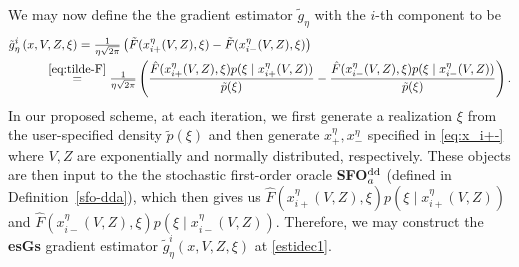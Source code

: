 \documentclass[11pt,reqno]{amsart}
\newcommand{\1}{{\bf 1}}
\newcommand{\2}{{\bf 2}}
\numberwithin{equation}{section}
\theoremstyle{remark}
\begin{document}
{					\medskip
					
					We may now define the the gradient estimator $\tilde{g}_\eta$ with the $i$-th component to be 
					\begin{align}\label{estidec1}
						\tilde{g}^i_\eta&\left(x,V,Z,\xi\right)=\tfrac{1}{\eta\sqrt{2\pi}}\left(\tilde{F}(x_{i+}^\eta(V,Z),\xi)-\tilde{F}(x_{i-}^\eta(V,Z),\xi)\right)\nonumber\\
						&\hspace{2em}\overset{\eqref{eq:tilde-F}}{=}\tfrac{1}{\eta\sqrt{2\pi}}\left(\frac{\hat{F}(x_{i+}^\eta(V,Z),\xi)p(\xi \mid x_{i+}^\eta(V,Z))}{\tilde{p}(\xi)}-\frac{\hat{F}(x_{i-}^\eta(V,Z),\xi)p(\xi \mid x_{i-}^\eta(V,Z))}{\tilde{p}(\xi)}\right).
					\end{align}
					In our proposed scheme, at each iteration, we first generate a {realization} $\xi$ from the user-specified density $\tilde{p}(\xi)$ and then generate  $x_{+}^{\eta}, x_{-}^{\eta}$ specified in \eqref{eq:x_i+-} where $V,Z$ are exponentially and normally distributed, respectively. These objects are then input to the {the stochastic first-order oracle  {\bf SFO$^{\rm dd}_a$} (defined in Definition~\ref{sfo-dda})},  which then gives us $\hat{F}(x_{i+}^\eta(V,Z),\xi)p(\xi \mid x_{i+}^\eta(V,Z))$ and $\hat{F}(x_{i-}^\eta(V,Z),\xi)p(\xi \mid x_{i-}^\eta(V,Z))$. Therefore, we may construct the {\bf esGs} gradient estimator $\tilde{g}^i_\eta\left(x,V,Z,\xi\right)$ at \eqref{estidec1}.\\
					
}
\end{document}
